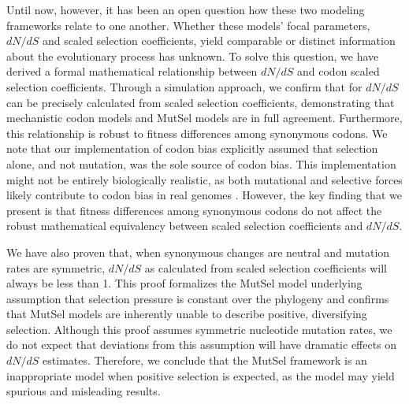 \documentclass{pnastwo}
\begin{document}
\begin{article}
Until now, however, it has been an open question how these two modeling frameworks relate to one another. Whether these models' focal parameters, $dN/dS$ and scaled selection coefficients, yield comparable or distinct information about the evolutionary process has unknown. To solve this question, we have derived a formal mathematical relationship between $dN/dS$ and codon scaled selection coefficients. Through a simulation approach, we confirm that for $dN/dS$ can be precisely calculated from scaled selection coefficients, demonstrating that mechanistic codon models and MutSel models are in full agreement. Furthermore, this relationship is robust to fitness differences among synonymous codons. We note that our implementation of codon bias explicitly assumed that selection alone, and not mutation, was the sole source of codon bias. This implementation might not be entirely biologically realistic, as both mutational and selective forces likely contribute to codon bias in real genomes \cite{Blumer1991, Duret2002, HershbergPetrov2008, Chen2009, PlotkinKudla2010}. However, the key finding that we present is that fitness differences among synonymous codons do not affect the robust mathematical equivalency between scaled selection coefficients and $dN/dS$. 

We have also proven that, when synonymous changes are neutral and mutation rates are symmetric, $dN/dS$ as calculated from scaled selection coefficients will always be less than 1. This proof formalizes the MutSel model underlying assumption that selection pressure is constant over the phylogeny and confirms that MutSel models are inherently unable to describe positive, diversifying selection. Although this proof assumes symmetric nucleotide mutation rates, we do not expect that deviations from this assumption will have dramatic effects on $dN/dS$ estimates. Therefore, we conclude that the MutSel framework is an inappropriate model when positive selection is expected, as the model may yield spurious and misleading results. 


\end{article}
\end{document}

